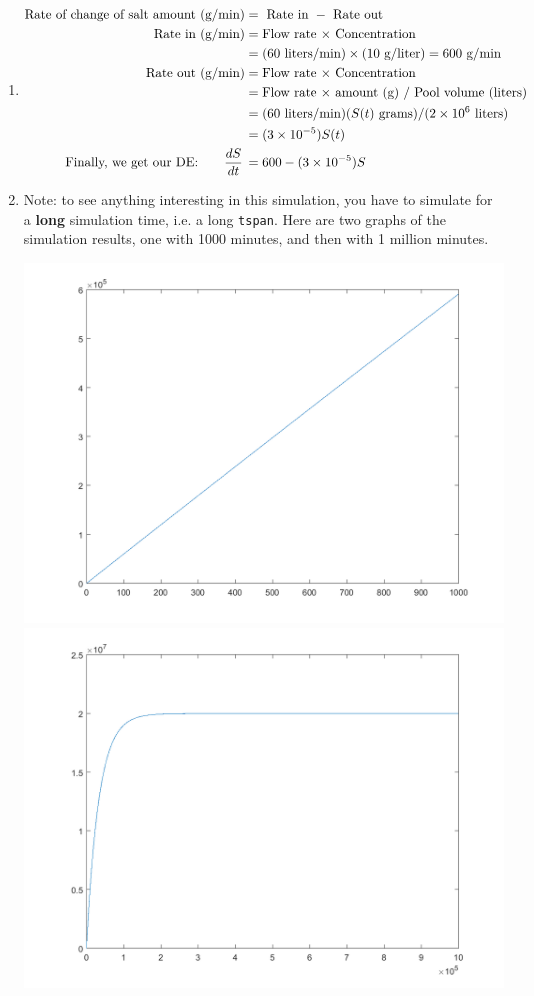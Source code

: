 \begin{enumerate}[1.]
\begin{Solution}
\begin{enumerate}
\item 
\begin{align*}
  \text{Rate of change of salt amount (g/min)} & = \text{ Rate in } - \text{ Rate out }  \\
  \text{Rate in (g/min)} & = \text{Flow rate $\times$ Concentration} \\
  & = (60 \text{ liters/min}) \times (10 \text{ g/liter}) = 600 \text{ g/min} \\
  \text{Rate out (g/min)} & = \text{Flow rate $\times$ Concentration}  \\
  & =\text{Flow rate $\times$ amount (g) / Pool volume (liters)} \\
  & = (60 \text{ liters/min}) (S(t) \text{ grams}) / (2 \times 10^6 \text{ liters}) \\
  & = (3 \times 10^{-5}) S(t) \\
  \text{Finally, we get our DE: } ~~~~~ \frac{d {S}}{dt} \, &= 600 - (3 \times 10^{-5}) S \\
\end{align*}

\item Note: to see anything interesting in this simulation, you have
  to simulate for a {\bf long} simulation time, i.e. a long
  \verb#tspan#.  Here are two graphs of the simulation results, one
  with 1000 minutes, and then with 1 million minutes.

\includegraphics[width=0.45\linewidth]{graphics/Week09_Pendulum/single_tank_1a} \hfill
\includegraphics[width=0.45\linewidth]{graphics/Week09_Pendulum/single_tank_1b} 


\end{enumerate}
\end{Solution}
\end{enumerate}
